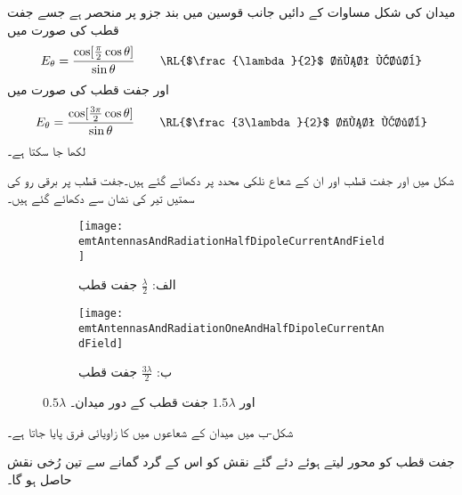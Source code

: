 میدان کی شکل مساوات  کے دائیں جانب قوسین میں بند جزو پر منحصر ہے جسے  جفت قطب کی صورت میں
\begin{align}\label{مساوات_اینٹینا_نصف_طول_موج_اینٹینا}
E_{\theta} =\frac{\cos [\frac{\pi}{2} \cos \theta]}{\sin \theta} \quad \quad \text{\RL{$\frac{\lambda}{2}$ جفت قطب}}
\end{align}
اور  جفت قطب کی صورت میں
\begin{align}
E_{\theta} =\frac{\cos [\frac{3\pi}{2} \cos \theta]}{\sin \theta} \quad \quad \text{\RL{$\frac{3\lambda}{2}$ جفت قطب}}
\end{align}
لکھا جا سکتا ہے۔

شکل  میں  اور  جفت قطب اور ان کے شعاع نلکی محدد پر دکھائے گئے ہیں۔جفت قطب پر برقی رو کی سمتیں تیر کی نشان سے دکھائے گئے ہیں۔

\begin{figure}
\centering
\begin{subfigure}{0.5\textwidth}
\centering
\texttt{[image: emtAntennasAndRadiationHalfDipoleCurrentAndField]}
\caption*{الف: $\frac{\lambda}{2}$ جفت قطب}
\end{subfigure}%
%
\begin{subfigure}{0.5\textwidth}
\centering
\texttt{[image: emtAntennasAndRadiationOneAndHalfDipoleCurrentAndField]}
\caption*{ب: $\frac{3\lambda}{2}$ جفت قطب}
\end{subfigure}%
\caption{$0.5\lambda$ اور $1.5\lambda$ جفت قطب کے دور میدان۔}
\label{شکل_اینٹینا_نصف_جفت_قطب_برقی_رو}
\end{figure}%

شکل-ب میں میدان کے شعاعوں میں  کا زاویائی فرق پایا جاتا ہے۔

جفت قطب کو محور لیتے ہوئے دئے گئے نقش کو اس کے گرد گمانے سے تین رُخی نقش حاصل ہو گا۔ 

